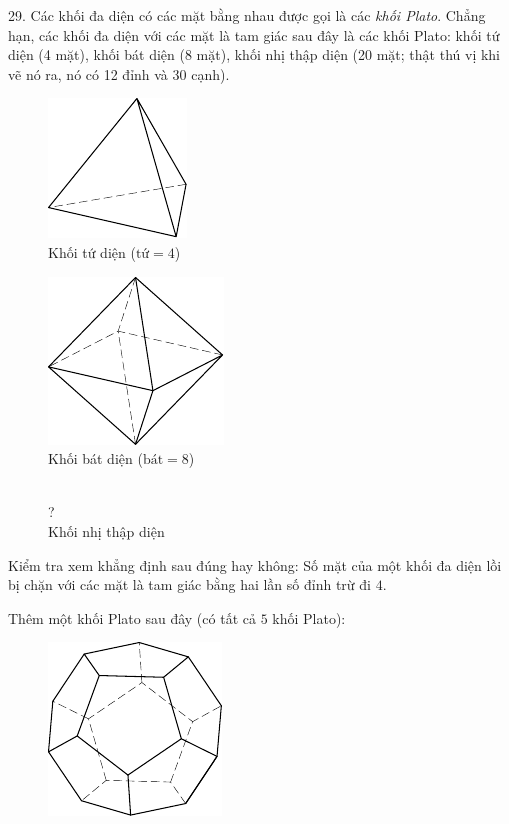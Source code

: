 \begin{problem}{29.}
	Các khối đa diện có các mặt bằng nhau được gọi là các \emph{khối Plato}. Chẳng hạn, các khối đa diện với các mặt là tam giác sau đây là các khối Plato: khối tứ diện (4 mặt), khối bát diện (8 mặt), khối nhị thập diện (20 mặt; thật thú vị khi vẽ nó ra, nó có 12 đỉnh và 30 cạnh).
	\begin{figure}
		\footnotesize
		\null\hfill
		\parbox{0.3\linewidth}{\centering\includegraphics{resources/taskbook-131}\\Khối tứ diện ($\text{tứ}= 4$)}
		\hfill
		\parbox{0.3\linewidth}{\centering\includegraphics{resources/taskbook-132}\\Khối bát diện ($\text{bát}= 8$)}
		\hfill\null\\
		{\Huge ?}\\Khối nhị thập diện
	\end{figure}
	Kiểm tra xem khẳng định sau đúng hay không: Số mặt của một khối đa diện lồi bị chặn với các mặt là tam giác bằng hai lần số đỉnh trừ đi $4$.

	Thêm một khối Plato sau đây (có tất cả $5$ khối Plato):
	\begin{figure}
		\includegraphics{resources/taskbook-14}
	\end{figure}
\end{problem}

